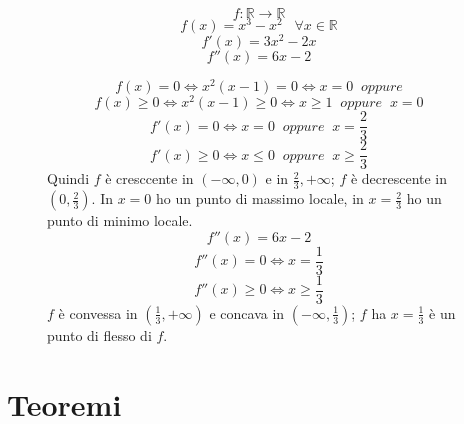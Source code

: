 \documentclass[a4paper]{article}
\theoremstyle{break}
\theoremstyle{break}
\theoremstyle{break}
\theoremstyle{break}
\begin{document}
\begin{figure}[H]
  \begin{example}
    \[
    f: \mathbb{R}\to \mathbb{R}
    \] 
    \[
    f(x) = x^3-x^2\;\;\; \forall x \in \mathbb{R}
    \] 
    \[
    f'(x) = 3x^2-2x
    \] 
    \[
    f''(x) = 6x-2
    \] 
    \label{D10}

    \[
    f(x) = 0 \Leftrightarrow x^2(x-1) = 0 \Leftrightarrow x = 0\;\; oppure
    \] 
    \[
    f(x) \ge 0 \Leftrightarrow x^2(x-1) \ge 0 \Leftrightarrow x \ge 1\;\; oppure\;\; x = 0
    \] 
    \[
    f'(x) = 0 \Leftrightarrow x=0 \;\; oppure\;\; x=\frac{2}{3}
    \] 
    \[
    f'(x) \ge 0 \Leftrightarrow x \le 0 \;\;oppure\;\; x \ge \frac{2}{3}
    \] 
    Quindi \( f \) è cresccente in \( (-\infty, 0) \) e in \( \frac{2}{3}, +\infty \); \( f \) 
    è decrescente in \( (0, \frac{2}{3}) \). In \( x=0 \) ho un punto di massimo locale,
    in \( x=\frac{2}{3} \) ho un punto di minimo locale.
    \[
    f''(x) = 6x-2
    \] 
    \[
    f''(x) = 0 \Leftrightarrow x = \frac{1}{3}
    \] 
    \[
    f''(x) \ge 0 \Leftrightarrow x \ge \frac{1}{3}
    \] 
    \( f \) è convessa in \( (\frac{1}{3}, +\infty) \) e concava in \( (-\infty, \frac{1}{3}) \);
    \( f \) ha \( x = \frac{1}{3} \) è un punto di flesso di \( f \).
  \end{example}
\end{figure}

\section{Teoremi}
\end{document}
